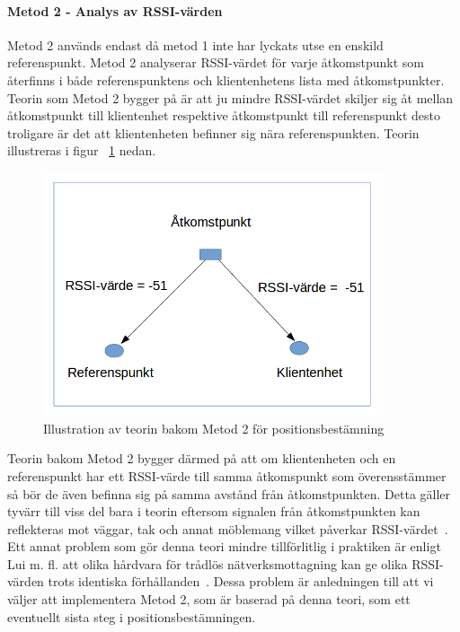 \documentclass[a4paper,12pt]{article}
\begin{document}
 \paragraph{Metod 2 - Analys av RSSI-värden}
 \leavevmode\newline
Metod 2 används endast då metod 1 inte har lyckats utse en enskild referenspunkt. Metod 2  analyserar RSSI-värdet för varje åtkomstpunkt som återfinns i både referenspunktens och klientenhetens lista med åtkomstpunkter.
Teorin som Metod 2 bygger på är att ju mindre RSSI-värdet skiljer sig åt mellan åtkomstpunkt till klientenhet respektive åtkomstpunkt till referenspunkt desto troligare är det att
klientenheten befinner sig nära referenspunkten.
Teorin illustreras i figur ~\ref{fig:TEO2} nedan.

 \begin{figure}[H]
   \centering
   \includegraphics[width=10cm]{media/TeoriMetod2.png}
   \caption{Illustration av teorin bakom Metod 2 för positionsbestämning}
   \label{fig:TEO2}
 \end{figure}

 Teorin bakom Metod 2 bygger därmed på att om klientenheten och en referenspunkt har ett RSSI-värde till samma åtkomspunkt som överensstämmer så bör de även befinna sig på samma avstånd från åtkomstpunkten. Detta gäller tyvärr till viss del bara i teorin eftersom signalen från åtkomstpunkten kan reflekteras mot väggar, tak och annat möblemang vilket påverkar RSSI-värdet~\cite{zanca2008experimental}. Ett annat problem som gör denna teori mindre tillförlitlig i praktiken är enligt Lui m. fl. att olika hårdvara för trådlös nätverksmottagning kan ge olika RSSI-värden trots identiska förhållanden~\cite{problem_with_RSSI}. Dessa problem är anledningen till att vi väljer att implementera Metod 2, som är baserad på denna teori, som ett eventuellt sista steg i positionsbestämningen.
\end{document}
